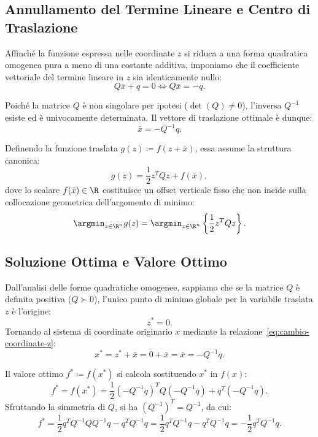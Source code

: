 \subsection{Annullamento del Termine Lineare e Centro di Traslazione}
Affinch\'e la funzione espressa nelle coordinate $z$ si riduca a una forma quadratica omogenea pura a meno di una costante additiva, imponiamo che il coefficiente vettoriale del termine lineare in $z$ sia identicamente nullo:
\begin{equation}
    Q \bar{x} + q = 0 \iff Q \bar{x} = -q.
\end{equation}

Poich\'e la matrice $Q$ \`e non singolare per ipotesi ($\det(Q) \neq 0$), l'inversa $Q^{-1}$ esiste ed \`e univocamente determinata. Il vettore di traslazione ottimale \`e dunque:
\begin{equation}
    \bar{x} = -Q^{-1} q.
    \label{eq:centro-traslazione-ottimo}
\end{equation}

Definendo la funzione traslata $g(z) \coloneqq f(z + \bar{x})$, essa assume la struttura canonica:
\begin{equation}
    g(z) = \frac{1}{2} z^T Q z + f(\bar{x}),
\end{equation}
dove lo scalare $f(\bar{x}) \in \R$ costituisce un offset verticale fisso che non incide sulla collocazione geometrica dell'argomento di minimo:
\begin{equation}
    \argmin_{z \in \R^n} g(z) = \argmin_{z \in \R^n} \left\{ \frac{1}{2} z^T Q z \right\}.
\end{equation}

\subsection{Soluzione Ottima e Valore Ottimo}
Dall'analisi delle forme quadratiche omogenee, sappiamo che se la matrice $Q$ \`e definita positiva ($Q \succ 0$), l'unico punto di minimo globale per la variabile traslata $z$ \`e l'origine:
\begin{equation}
    z^* = 0.
\end{equation}
Tornando al sistema di coordinate originario $x$ mediante la relazione~\eqref{eq:cambio-coordinate-z}:
\begin{equation}
    x^* = z^* + \bar{x} = 0 + \bar{x} = \bar{x} = -Q^{-1} q.
\end{equation}

Il valore ottimo $f^* \coloneqq f(x^*)$ si calcola sostituendo $x^*$ in $f(x)$:
\begin{equation}
    f^* = f(x^*) = \frac{1}{2} (-Q^{-1} q)^T Q (-Q^{-1} q) + q^T (-Q^{-1} q).
\end{equation}
Sfruttando la simmetria di $Q$, si ha $(Q^{-1})^T = Q^{-1}$, da cui:
\begin{equation}
    f^* = \frac{1}{2} q^T Q^{-1} Q Q^{-1} q - q^T Q^{-1} q = \frac{1}{2} q^T Q^{-1} q - q^T Q^{-1} q = -\frac{1}{2} q^T Q^{-1} q.
    \label{eq:valore-ottimo-non-singolare}
\end{equation}

